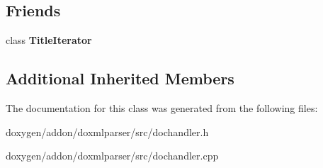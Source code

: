 \subsection*{Friends}
\begin{DoxyCompactItemize}
\item 
\mbox{\label{class_title_handler_a6bb9587c08cb027d17f079c06df0f347}} 
class {\bfseries Title\+Iterator}
\end{DoxyCompactItemize}
\subsection*{Additional Inherited Members}


The documentation for this class was generated from the following files\+:\begin{DoxyCompactItemize}
\item 
doxygen/addon/doxmlparser/src/dochandler.\+h\item 
doxygen/addon/doxmlparser/src/dochandler.\+cpp\end{DoxyCompactItemize}
